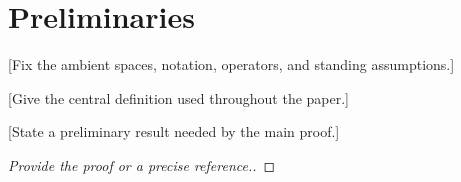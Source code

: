 \section{Preliminaries}
\label{sec:preliminaries}

[Fix the ambient spaces, notation, operators, and standing assumptions.]

\begin{definition}
\label{def:basic-object}
[Give the central definition used throughout the paper.]
\end{definition}

\begin{lemma}
\label{lem:basic-tool}
[State a preliminary result needed by the main proof.]
\end{lemma}

\begin{proof}
[Provide the proof or a precise reference.]
\end{proof}
